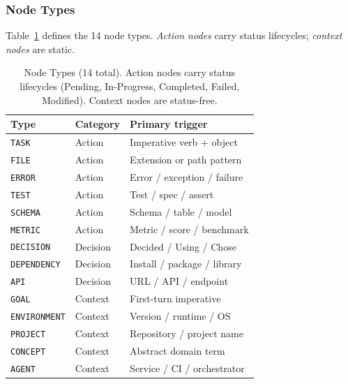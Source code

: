 \documentclass[journal]{IEEEtran}
\begin{document}
\subsubsection{Node Types}
Table~\ref{tab:nodetypes} defines the 14 node types.
\emph{Action nodes} carry status lifecycles;
\emph{context nodes} are static.

\begin{table}[t]
  \centering
  \caption{Node Types (14 total). Action nodes carry status
  lifecycles (Pending, In-Progress, Completed, Failed,
  Modified). Context nodes are status-free.}
  \label{tab:nodetypes}
  \renewcommand{\arraystretch}{1.15}
  \begin{tabular}{@{}p{2.4cm}p{1.7cm}p{3.5cm}@{}}
    \toprule
    \textbf{Type} & \textbf{Category} & \textbf{Primary trigger} \\
    \midrule
    \texttt{TASK}       & Action    & Imperative verb + object \\
    \texttt{FILE}       & Action    & Extension or path pattern \\
    \texttt{ERROR}      & Action    & Error / exception / failure \\
    \texttt{TEST}       & Action    & Test / spec / assert \\
    \texttt{SCHEMA}     & Action    & Schema / table / model \\
    \texttt{METRIC}     & Action    & Metric / score / benchmark \\
    \midrule
    \texttt{DECISION}   & Decision  & Decided / Using / Chose \\
    \texttt{DEPENDENCY} & Decision  & Install / package / library \\
    \texttt{API}        & Decision  & URL / API / endpoint \\
    \midrule
    \texttt{GOAL}       & Context   & First-turn imperative \\
    \texttt{ENVIRONMENT}& Context   & Version / runtime / OS \\
    \texttt{PROJECT}    & Context   & Repository / project name \\
    \texttt{CONCEPT}    & Context   & Abstract domain term \\
    \texttt{AGENT}      & Context   & Service / CI / orchestrator \\
    \bottomrule
  \end{tabular}
\end{table}
\end{document}
